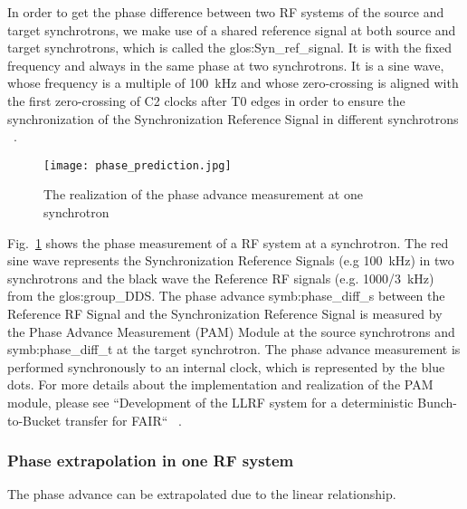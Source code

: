 In order to get the phase difference between two RF systems of the source and target synchrotrons, we make use of a shared reference signal at both source and target synchrotrons, which is called the \gls{glos:Syn_ref_signal}. It is with the fixed frequency and always in the same phase at two synchrotrons. It is a sine wave, whose frequency is a multiple of \SI{100}{kHz} and whose zero-crossing is aligned with the first zero-crossing of C2 clocks after T0 edges in order to ensure the synchronization of the Synchronization Reference Signal in different synchrotrons ~\cite{ferrand_system_2014, ferrand_system_2015}. 

\begin{figure}[H]
   \centering   
   \texttt{[image: phase\_prediction.jpg]}
   \caption{The realization of the phase advance measurement at one synchrotron}
   \label{phase_prediction}
\end{figure}

Fig.~\ref{phase_prediction} shows the phase measurement of a RF system at a synchrotron. The red sine wave represents the Synchronization Reference Signals (e.g \SI{100}{kHz}) in two synchrotrons and the black wave the Reference RF signals (e.g. \SI{1000/3}{kHz}) from the \gls{glos:group_DDS}. The phase advance \gls{symb:phase_diff_s} between the Reference RF Signal and the Synchronization Reference Signal is measured by the Phase Advance Measurement (\gls{PAM}) Module at the source synchrotrons and \gls{symb:phase_diff_t} at the target synchrotron. The phase advance measurement is performed synchronously to an internal clock, which is represented by the blue dots. For more details about the implementation and realization of the PAM module, please see ``Development of the LLRF system for a deterministic Bunch-to-Bucket transfer for FAIR`` ~\cite{ferrand_development_????}. 
\subsubsection{Phase extrapolation in one RF system}
The phase advance can be extrapolated due to the linear relationship.

